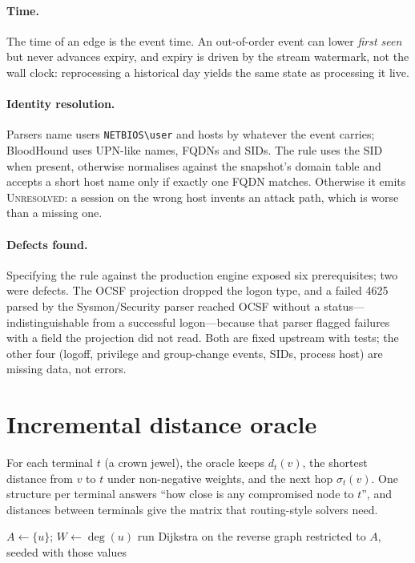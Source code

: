 \documentclass[10pt,twocolumn]{article}
\begin{document}
\paragraph{Time.} The time of an edge is the event time. An out-of-order event can lower
\emph{first seen} but never advances expiry, and expiry is driven by the stream watermark,
not the wall clock: reprocessing a historical day yields the same state as processing it
live.

\paragraph{Identity resolution.} Parsers name users \texttt{NETBIOS\textbackslash user}
and hosts by whatever the event carries; BloodHound uses UPN-like names, FQDNs and SIDs.
The rule uses the SID when present, otherwise normalises against the snapshot's domain
table and accepts a short host name only if exactly one FQDN matches. Otherwise it emits
\textsc{Unresolved}: a session on the wrong host invents an attack path, which is worse
than a missing one.

\paragraph{Defects found.} Specifying the rule against the production engine exposed six
prerequisites; two were defects. The OCSF projection dropped the logon type, and a failed
4625 parsed by the Sysmon/Security parser reached OCSF without a status---indistinguishable
from a successful logon---because that parser flagged failures with a field the projection
did not read. Both are fixed upstream with tests; the other four (logoff, privilege and
group-change events, SIDs, process host) are missing data, not errors.

\section{Incremental distance oracle}\label{sec:oracle}

For each terminal $t$ (a crown jewel), the oracle keeps $d_t(v)$, the shortest distance
from $v$ to $t$ under non-negative weights, and the next hop $\sigma_t(v)$. One structure
per terminal answers ``how close is any compromised node to $t$'', and distances between
terminals give the matrix that routing-style solvers need.

\begin{algorithm}[t]
\caption{Repair after deleting or raising edge $(u,v)$ for terminal $t$}\label{alg:raise}
\small
{}
$A\gets\{u\}$; $W\gets\deg(u)$\;
run Dijkstra on the reverse graph restricted to $A$, seeded with those values\;
\end{algorithm}
\end{document}
